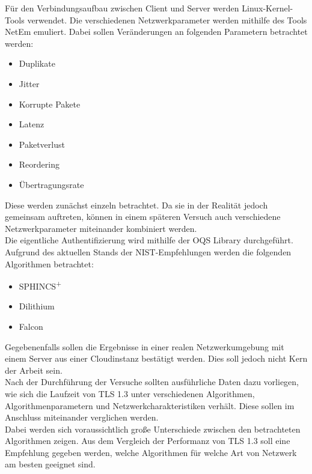 	Für den Verbindungsaufbau zwischen Client und Server werden Linux-Kernel-Tools verwendet. Die verschiedenen Netzwerkparameter werden mithilfe des Tools NetEm emuliert. Dabei sollen Veränderungen an folgenden Parametern betrachtet werden:

	\begin{itemize}
		\item Duplikate	
		\item Jitter
		\item Korrupte Pakete
		\item Latenz
		\item Paketverlust
		\item Reordering
		\item Übertragungsrate
	\end{itemize}

	Diese werden zunächst einzeln betrachtet. Da sie in der Realität jedoch gemeinsam auftreten, können in einem späteren Versuch auch verschiedene Netzwerkparameter miteinander kombiniert werden.\\
	
	Die eigentliche Authentifizierung wird mithilfe der \ac{OQS} Library \cite{Stebila2017} durchgeführt. Aufgrund des aktuellen Stands der NIST-Empfehlungen werden die folgenden Algorithmen betrachtet:
	
	\begin{itemize}
		\item SPHINCS\textsuperscript{+}
		\item Dilithium
		\item Falcon
	\end{itemize}

	Gegebenenfalls sollen die Ergebnisse in einer realen Netzwerkumgebung mit einem Server aus einer Cloudinstanz bestätigt werden. Dies soll jedoch nicht Kern der Arbeit sein.\\
	
	Nach der Durchführung der Versuche sollten ausführliche Daten dazu vorliegen, wie sich die Laufzeit von TLS 1.3 unter verschiedenen Algorithmen, Algorithmenparametern und Netzwerkcharakteristiken verhält. Diese sollen im Anschluss miteinander verglichen werden.\\
	
	Dabei werden sich voraussichtlich große Unterschiede zwischen den betrachteten Algorithmen zeigen. Aus dem Vergleich der Performanz von TLS 1.3 soll eine Empfehlung gegeben werden, welche Algorithmen für welche Art von Netzwerk am besten geeignet sind.
